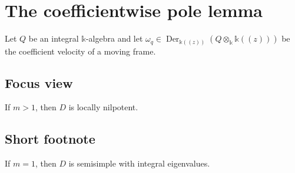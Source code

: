 \documentclass[11pt]{article}
\newcommand{\kfield}{\mathbb{k}}
\newcommand{\Der}{\operatorname{Der}}
\begin{document}
\section{The coefficientwise pole lemma}

Let \(Q\) be an integral \(\kfield\)-algebra and let \(\omega_q\in\Der_{\kfield((z))}(Q\otimes_{\kfield}\kfield((z)))\) be the coefficient velocity of a moving frame.

\subsection*{Focus view}
If \(m>1\), then \(D\) is locally nilpotent.

\subsection*{Short footnote}
If \(m=1\), then \(D\) is semisimple with integral eigenvalues.

\InterlinearPrintAppendix
\end{document}
